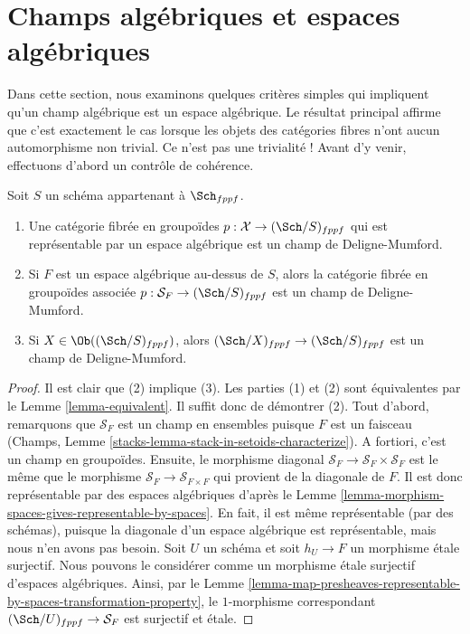 \section{Champs algébriques et espaces algébriques}
\label{section-stacks-spaces}

\noindent
Dans cette section, nous examinons quelques critères simples qui impliquent qu'un
champ algébrique est un espace algébrique. Le résultat principal affirme que c'est
exactement le cas lorsque les objets des catégories fibres n'ont aucun
automorphisme non trivial. Ce n'est pas une trivialité ! Avant d'y venir,
effectuons d'abord un contrôle de cohérence.

\begin{lemma}
\label{lemma-representable-algebraic}
Soit $S$ un schéma appartenant à $\Sch_{fppf}$.
\begin{enumerate}
\item Une catégorie fibrée en groupoïdes
$p : \mathcal{X} \to (\Sch/S)_{fppf}$
qui est représentable par un espace algébrique est un champ de Deligne-Mumford.
\item Si $F$ est un espace algébrique au-dessus de $S$, alors la
catégorie fibrée en groupoïdes associée
$p : \mathcal{S}_F \to (\Sch/S)_{fppf}$
est un champ de Deligne-Mumford.
\item Si $X \in \Ob((\Sch/S)_{fppf})$, alors
$(\Sch/X)_{fppf} \to (\Sch/S)_{fppf}$ est
un champ de Deligne-Mumford.
\end{enumerate}
\end{lemma}

\begin{proof}
Il est clair que (2) implique (3).
Les parties (1) et (2) sont équivalentes par le Lemme \ref{lemma-equivalent}.
Il suffit donc de démontrer (2).
Tout d'abord, remarquons que $\mathcal{S}_F$ est un champ en ensembles puisque
$F$ est un faisceau (Champs, Lemme
\ref{stacks-lemma-stack-in-setoids-characterize}).
A fortiori, c'est un champ en groupoïdes. Ensuite, le morphisme diagonal
$\mathcal{S}_F \to \mathcal{S}_F  \times \mathcal{S}_F$
est le même que le morphisme $\mathcal{S}_F \to \mathcal{S}_{F \times F}$
qui provient de la diagonale de $F$. Il est donc représentable
par des espaces algébriques d'après le
Lemme \ref{lemma-morphism-spaces-gives-representable-by-spaces}.
En fait, il est même représentable (par des schémas), puisque la diagonale d'un
espace algébrique est représentable, mais nous n'en avons pas besoin.
Soit $U$ un schéma et soit $h_U \to F$ un morphisme \'etale surjectif.
Nous pouvons le considérer comme un morphisme \'etale surjectif d'espaces algébriques.
Ainsi, par le
Lemme
\ref{lemma-map-presheaves-representable-by-spaces-transformation-property},
le $1$-morphisme correspondant $(\Sch/U)_{fppf} \to \mathcal{S}_F$
est surjectif et \'etale.
\end{proof}

